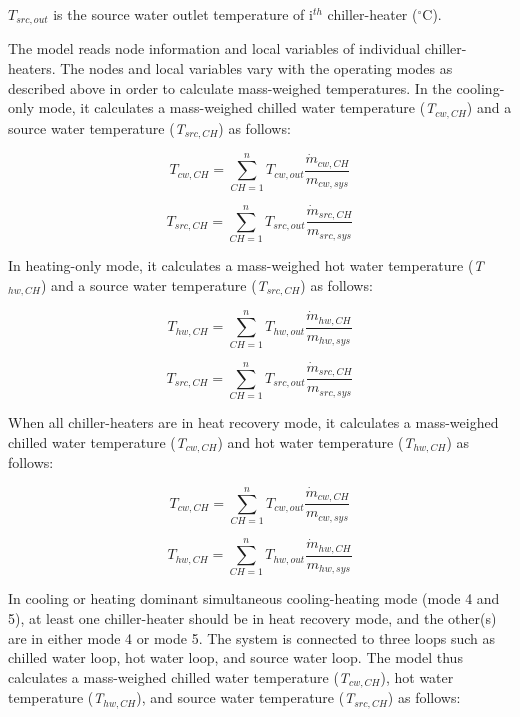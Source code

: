 \({T_{src,out}}\) is the source water outlet temperature of i\(^{th}\) chiller-heater (\(^{\circ}\)C).

The model reads node information and local variables of individual chiller-heaters. The nodes and local variables vary with the operating modes as described above in order to calculate mass-weighed temperatures. In the cooling-only mode, it calculates a mass-weighed chilled water temperature (\emph{T\(_{cw,CH}\)}) and a source water temperature (\emph{T\(_{src,CH}\)}) as follows:

\begin{equation}
{T_{cw,CH}} = \sum\limits_{CH = 1}^n {{T_{cw,out}}} \frac{{{{\dot m}_{cw,CH}}}}{{{m_{cw,sys}}}}
\end{equation}

\begin{equation}
{T_{src,CH}} = \sum\limits_{CH = 1}^n {{T_{src,out}}} \frac{{{{\dot m}_{src,CH}}}}{{{m_{src,sys}}}}
\end{equation}

In heating-only mode, it calculates a mass-weighed hot water temperature (\emph{T\(_{hw,CH}\)}) and a source water temperature (\emph{T\(_{src,CH}\)}) as follows:

\begin{equation}
{T_{hw,CH}} = \sum\limits_{CH = 1}^n {{T_{hw,out}}} \frac{{{{\dot m}_{hw,CH}}}}{{{m_{hw,sys}}}}
\end{equation}

\begin{equation}
{T_{src,CH}} = \sum\limits_{CH = 1}^n {{T_{src,out}}} \frac{{{{\dot m}_{src,CH}}}}{{{m_{src,sys}}}}
\end{equation}

When all chiller-heaters are in heat recovery mode, it calculates a mass-weighed chilled water temperature (\emph{T\(_{cw,CH}\)}) and hot water temperature (\emph{T\(_{hw,CH}\)}) as follows:

\begin{equation}
{T_{cw,CH}} = \sum\limits_{CH = 1}^n {{T_{cw,out}}} \frac{{{{\dot m}_{cw,CH}}}}{{{m_{cw,sys}}}}
\end{equation}

\begin{equation}
{T_{hw,CH}} = \sum\limits_{CH = 1}^n {{T_{hw,out}}} \frac{{{{\dot m}_{hw,CH}}}}{{{m_{hw,sys}}}}
\end{equation}

In cooling or heating dominant simultaneous cooling-heating mode (mode 4 and 5), at least one chiller-heater should be in heat recovery mode, and the other(s) are in either mode 4 or mode 5. The system is connected to three loops such as chilled water loop, hot water loop, and source water loop. The model thus calculates a mass-weighed chilled water temperature (\emph{T\(_{cw,CH}\)}), hot water temperature (\emph{T\(_{hw,CH}\)}), and source water temperature (\emph{T\(_{src,CH}\)}) as follows:

